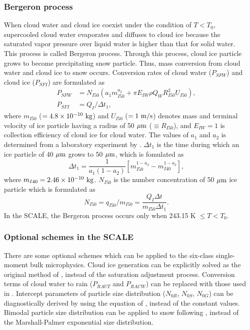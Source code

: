 \subsubsection{Bergeron process}
When cloud water and cloud ice coexist under the condition of $T < T_{0}$, supercooled cloud water evaporates and diffuses to cloud ice because the saturated vapor pressure over liquid water is higher than that for solid water. This process is called Bergeron process. Through this process, cloud ice particle grows to become precipitating snow particle. Thus, mass conversion from cloud water and cloud ice to snow occurs. Conversion rates of cloud water ($P_{SFW}$) and cloud ice ($P_{SFI}$) are formulated as
\begin{align}
  P_{SFW}&=N_{I50}(a_{1}m^{a_{2}}_{I50}+\pi E_{IW}\rho Q_{W}R^2_{I50}U_{I50}), \\
  P_{SFI}&=Q_{I}/\Delta t_{1},
\end{align}
where $m_{I50}$ ($=4.8\times10^{-10} {\rm \ kg}$) and $U_{I50}$ ($=1{\rm \ m/s}$) denotes mass and terminal velocity of ice particle having a radius of 50 ${\rm \mu m}$ ($\equiv R_{I50}$), and $E_{IW}=1$ is collection efficiency of cloud ice for cloud water. The values of $a_{1}$ and $a_{2}$ is determined from a laboratory experiment by \citet{koenig_1971}. $\Delta t_{1}$ is the time during which an ice particle of 40 ${\rm \mu m}$ grows to 50 ${\rm \mu m}$, which is fomulated as
\begin{equation}
  \Delta t_{1}=\frac{1}{a_{1}(1-a_{2})}\left[m^{1-a_{2}}_{I50}-m^{1-a_{2}}_{I40}\right],
\end{equation}
where $m_{I40}=2.46\times10^{-10} {\rm \ kg}$. $N_{I50}$ is the number concentration of 50 ${\rm \mu m}$ ice particle which is formulated as
\begin{equation}
  N_{I50}=q_{I50}/m_{I50}=\frac{Q_{I}\Delta t}{m_{I50}\Delta t_{1}}.
\end{equation}
In the SCALE, the Bergeron process occurs only when 243.15 K $\leq T<T_{0}$.

\subsubsection{Optional schemes in the SCALE}
There are some optional schemes which can be applied to the six-class single-moment bulk microphysics. Cloud ice generation can be explicitly solved as the original method of \citet{lin_etal_1983}, instead of the saturation adjustment process. Conversion terms of cloud water to rain ($P_{RAUT}$ and $P_{RACW}$) can be replaced with those used in \citet{khairoutdinov_and_kogan_2000}. Intercept parameters of particle size distribution ($N_{0R}$, $N_{0S}$, $N_{0G}$) can be diagnostically derived by using the equation of \citet{wainwright_etal_2014}, instead of the constant values. Bimodal particle size distribution can be applied to snow following \citet{roh_and_satoh_2007}, instead of the Marshall-Palmer exponential size distribution.

